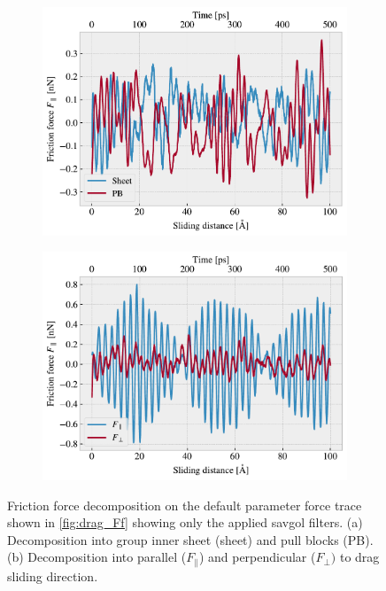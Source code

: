 \begin{figure}[H]
  \centering
  \begin{subfigure}[t]{0.49\textwidth}
    \centering
    \includegraphics[width=\textwidth]{figures/baseline/decomp_group.pdf}
    \caption{}
    \label{fig:decomp_group}
  \end{subfigure}
  \hfill
  \begin{subfigure}[t]{0.49\textwidth}
      \centering
      \includegraphics[width=\textwidth]{figures/baseline/decomp_direc.pdf}
      \caption{}
      \label{fig:decomp_direc}
  \end{subfigure}
  \caption{Friction force decomposition on the default parameter force trace shown in \cref{fig:drag_Ff} showing only the applied savgol filters. (a) Decomposition into group inner sheet (sheet) and pull blocks (PB). (b) Decomposition into parallel ($F_{\parallel}$) and perpendicular ($F_{\perp})$ to drag sliding direction.}
  \label{fig:decomp}
\end{figure}


